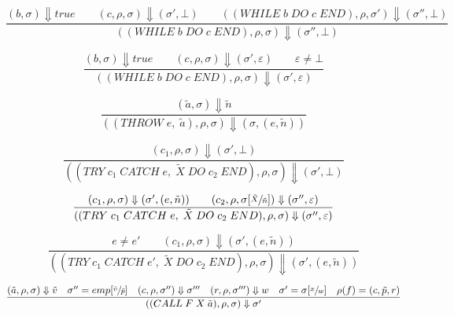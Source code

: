 \begin{equation}
\frac{(b, \sigma) \Downarrow true \qquad (c, \rho, \sigma) \Downarrow (\sigma', \bot) \qquad ((WHILE\; b\; DO\; c\; END), \rho, \sigma') \Downarrow (\sigma'', \bot)}{((WHILE\; b\; DO\; c\; END), \rho, \sigma) \Downarrow (\sigma'', \bot)}
\end{equation}

\begin{equation}
\frac{(b, \sigma) \Downarrow true \qquad (c, \rho, \sigma) \Downarrow (\sigma', \varepsilon) \qquad \varepsilon \neq \bot}{((WHILE\; b\; DO\; c\; END), \rho, \sigma) \Downarrow (\sigma', \varepsilon)}
\end{equation}

\begin{equation}
\frac{(\tilde{a}, \sigma) \Downarrow \tilde{n}}{((THROW\; e,\; \tilde{a}), \rho, \sigma) \Downarrow (\sigma, (e, \tilde{n}))}
\end{equation}

\begin{equation}
\frac{(c_1, \rho, \sigma) \Downarrow (\sigma', \bot)}{((TRY\; c_1\; CATCH\; e,\; \tilde{X}\; DO\; c_2\; END), \rho, \sigma) \Downarrow (\sigma', \bot)}
\end{equation}

\begin{equation}
\frac{(c_1, \rho, \sigma) \Downarrow (\sigma', (e, \tilde{n})) \qquad (c_2, \rho, \sigma[\sfrac{\tilde{X}}{\tilde{n}}]) \Downarrow (\sigma'', \varepsilon)}{((TRY\; c_1\; CATCH\; e,\; \tilde{X}\; DO\; c_2\; END), \rho, \sigma) \Downarrow (\sigma'', \varepsilon)}
\end{equation}

\begin{equation}
\frac{e \neq e' \qquad (c_1, \rho, \sigma) \Downarrow (\sigma', (e, \tilde{n}))}{((TRY\; c_1\; CATCH\; e',\; \tilde{X}\; DO\; c_2\; END), \rho, \sigma) \Downarrow (\sigma', (e, \tilde{n}))}
\end{equation}

\begin{equation}
\frac
{(\tilde{a},\rho,\sigma) \Downarrow \tilde{v} \quad \sigma''= emp[\sfrac{\tilde{v}}{\tilde{p}}] \quad (c, \rho, \sigma'') \Downarrow \sigma''' \quad (r,\rho,\sigma''') \Downarrow w \quad \sigma' = \sigma[\sfrac{x}{w}] \quad \rho(f) = (c, \tilde{p}, r)}
{((CALL\; F \; X  \; \tilde{a}), \rho, \sigma) \Downarrow \sigma'}
\end{equation}
